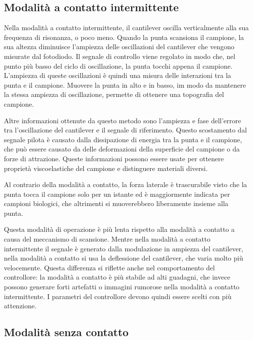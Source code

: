 \documentclass[../main.tex]{subfiles}
\begin{document}
\subsection{Modalità a contatto intermittente} \label{s:afm_ic}

Nella modalità a contatto intermittente, il cantilever oscilla verticalmente alla sua frequenza di risonanza, o poco meno. Quando la punta scansiona il campione, la sua altezza diminuisce l'ampiezza delle oscillazioni del cantilever che vengono misurate dal fotodiodo. Il segnale di controllo viene regolato in modo che, nel punto più basso del ciclo di oscillazione, la punta tocchi appena il campione. L'ampiezza di queste oscillazioni è quindi una misura delle interazioni tra la punta e il campione. Muovere la punta in alto e in basso, im modo da mantenere la stessa ampiezza di oscillazione, permette di ottenere una topografia del campione.

Altre informazioni ottenute da questo metodo sono l'ampiezza e fase dell'errore tra l'oscillazione del cantilever e il segnale di riferimento. Questo scostamento dal segnale pilota è causato dalla dissipazione di energia tra la punta e il campione, che può essere causato da delle deformazioni della superficie del campione o da forze di attrazione. Queste informazioni possono essere usate per ottenere proprietà viscoelastiche del campione e distinguere materiali diversi.\cite{bruker_phase_imaging}

Al contrario della modalità a contatto, la forza laterale è trascurabile visto che la punta tocca il campione solo per un istante ed è maggiormente indicata per campioni biologici, che altrimenti si muoverebbero liberamente insieme alla punta.\cite{karrasch_1993}

Questa modalità di operazione è più lenta rispetto alla modalità a contatto a causa del meccanismo di scansione. Mentre nella modalità a contatto intermittente il segnale è generato dalla modulazione in ampiezza del cantilever, nella modalità a contatto si usa la deflessione del cantilever, che varia molto più velocemente. Questa differenza si riflette anche nel comportamento del controllore: la modalità a contatto è più stabile ad alti guadagni, che invece possono generare forti artefatti o immagini rumorose nella modalità a contatto intermittente. I parametri del controllore devono quindi essere scelti con più attenzione. 

\subsection{Modalità senza contatto} \label{s:afm_nc}
\end{document}
